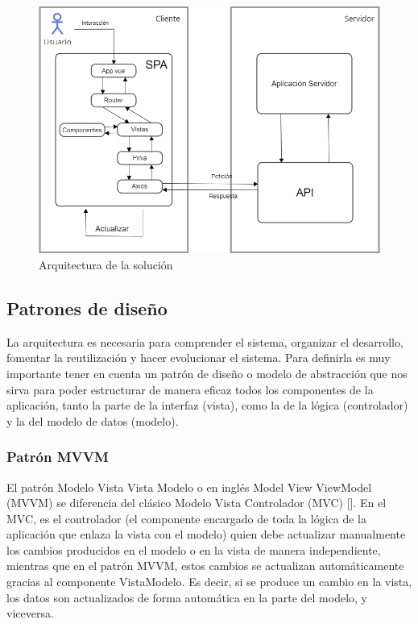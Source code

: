 \begin{figure}[htbp]
\centering
\includegraphics[width=\textwidth]{Graphics/mySPAtt}
\caption{Arquitectura de la solución}
\label{fig:spa}
\end{figure}

\subsection{Patrones de diseño}

La arquitectura es necesaria para comprender el sistema, organizar el desarrollo, fomentar la reutilización y hacer evolucionar el sistema. Para definirla es muy importante tener en cuenta un patrón de diseño o modelo de abstracción que nos sirva para poder estructurar de manera eficaz todos los componentes de la aplicación, tanto la parte de la interfaz (vista), como la de la lógica (controlador) y la del modelo de datos (modelo).


\subsubsection{Patrón MVVM}

El patrón Modelo Vista Vista Modelo o en inglés Model View ViewModel (MVVM) se diferencia del clásico Modelo Vista Controlador (MVC) [\cite{45}]. En el MVC, es el controlador (el componente encargado de toda la lógica de la aplicación que enlaza la vista con el modelo) quien debe actualizar manualmente los cambios producidos en el modelo o en la vista de manera independiente, mientras que en el patrón MVVM, estos cambios se actualizan automáticamente gracias al componente VistaModelo. Es decir, si se produce un cambio en la vista, los datos son actualizados de forma automática en la parte del modelo, y viceversa.

